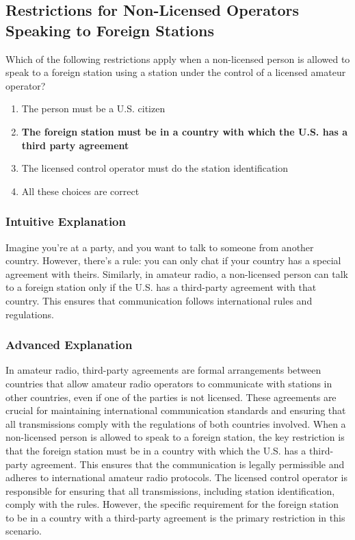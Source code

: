\subsection{Restrictions for Non-Licensed Operators Speaking to Foreign Stations}
\label{T1F07}

\begin{tcolorbox}[colback=gray!10!white,colframe=black!75!black,title=T1F07]
Which of the following restrictions apply when a non-licensed person is allowed to speak to a foreign station using a station under the control of a licensed amateur operator?
\begin{enumerate}[label=\Alph*,noitemsep]
    \item The person must be a U.S. citizen
    \item \textbf{The foreign station must be in a country with which the U.S. has a third party agreement}
    \item The licensed control operator must do the station identification
    \item All these choices are correct
\end{enumerate}
\end{tcolorbox}

\subsubsection{Intuitive Explanation}
Imagine you're at a party, and you want to talk to someone from another country. However, there's a rule: you can only chat if your country has a special agreement with theirs. Similarly, in amateur radio, a non-licensed person can talk to a foreign station only if the U.S. has a third-party agreement with that country. This ensures that communication follows international rules and regulations.

\subsubsection{Advanced Explanation}
In amateur radio, third-party agreements are formal arrangements between countries that allow amateur radio operators to communicate with stations in other countries, even if one of the parties is not licensed. These agreements are crucial for maintaining international communication standards and ensuring that all transmissions comply with the regulations of both countries involved. When a non-licensed person is allowed to speak to a foreign station, the key restriction is that the foreign station must be in a country with which the U.S. has a third-party agreement. This ensures that the communication is legally permissible and adheres to international amateur radio protocols. The licensed control operator is responsible for ensuring that all transmissions, including station identification, comply with the rules. However, the specific requirement for the foreign station to be in a country with a third-party agreement is the primary restriction in this scenario.